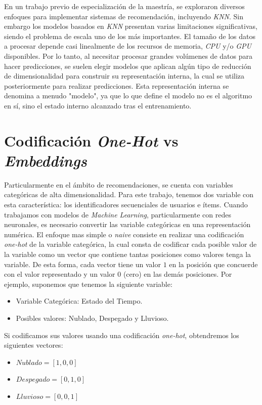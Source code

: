 \documentclass[11pt,a4paper,twoside]{thesis}
\begin{document}
En un trabajo previo de especialización \cite{src} de la maestría, se exploraron diversos enfoques para implementar sistemas de recomendación, incluyendo \textit{KNN}. Sin embargo los modelos basados en \textit{KNN} presentan varias limitaciones significativas, siendo el problema de escala uno de los más importantes. El tamaño de los datos a procesar depende casi linealmente de los recursos de memoria, \textit{CPU} y/o \textit{GPU} disponibles. Por lo tanto, al necesitar procesar grandes volúmenes de datos para hacer predicciones, se suelen elegir modelos que aplican algún tipo de reducción de dimensionalidad para construir su representación interna, la cual se utiliza posteriormente para realizar predicciones. Esta representación interna se denomina a menudo "modelo", ya que lo que define el modelo no es el algoritmo en sí, sino el estado interno alcanzado tras el entrenamiento.

\section{Codificación \textit{One-Hot} vs \textit{Embeddings}}

Particularmente en el ámbito de recomendaciones, se cuenta con variables
categóricas de alta dimensionalidad. Para este trabajo, tenemos dos variable
con esta característica: los identificadores secuenciales de usuarios e ítems.
Cuando trabajamos con modelos de \textit{Machine Learning}, particularmente con
redes neuronales, es necesario convertir las variable categóricas en una
representación numérica. El enfoque mas simple o \textit{naive} consiste en
realizar una codificación \textit{one-hot} de la variable categórica, la cual
consta de codificar cada posible valor de la variable como un vector que
contiene tantas posiciones como valores tenga la variable. De esta forma, cada
vector tiene un valor $1$ en la posición que concuerde con el valor
representado y un valor $0$ (cero) en las demás posiciones. Por ejemplo,
suponemos que tenemos la siguiente variable:

\begin{itemize}
	\item Variable Categórica: Estado del Tiempo.
	\item Posibles valores: Nublado, Despegado y Lluvioso.
\end{itemize}

Si codificamos sus valores usando una codificación \textit{one-hot},
obtendremos los siguientes vectores:

\begin{itemize}
	\item $Nublado    = [1, 0, 0]$
	\item $Despegado  = [0, 1, 0]$
	\item $Lluvioso   = [0, 0, 1]$
\end{itemize}
\end{document}

